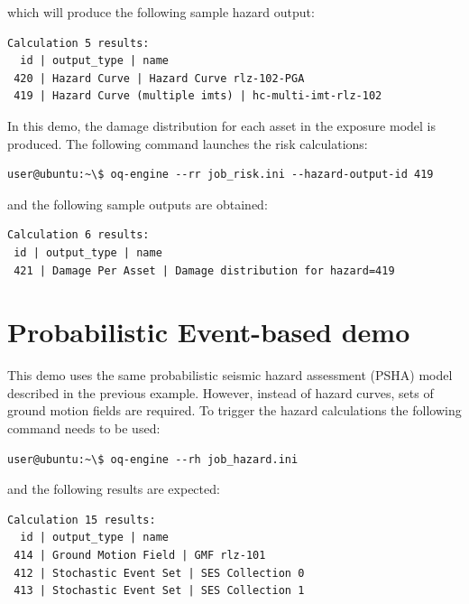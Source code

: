 which will produce the following sample hazard output:

\begin{Verbatim}[frame=single, commandchars=\\\{\}, samepage=true]
Calculation 5 results:
  id | output_type | name
 420 | Hazard Curve | Hazard Curve rlz-102-PGA
 419 | Hazard Curve (multiple imts) | hc-multi-imt-rlz-102
\end{Verbatim}

In this demo, the damage distribution for each asset in the exposure model is produced. The following command launches the risk calculations:

\begin{Verbatim}[frame=single, commandchars=\\\{\}, samepage=true]
user@ubuntu:~\$ oq-engine --rr job_risk.ini --hazard-output-id 419
\end{Verbatim}

and the following sample outputs are obtained:

\begin{Verbatim}[frame=single, commandchars=\\\{\}, samepage=true]
Calculation 6 results:
 id | output_type | name
 421 | Damage Per Asset | Damage distribution for hazard=419
\end{Verbatim}

\section{Probabilistic Event-based demo}
This demo uses the same probabilistic seismic hazard assessment (PSHA) model described in the previous example. However, instead of hazard curves, sets of ground motion fields are required. To trigger the hazard calculations the following command needs to be used:

\begin{Verbatim}[frame=single, commandchars=\\\{\}, samepage=true]
user@ubuntu:~\$ oq-engine --rh job_hazard.ini
\end{Verbatim}

and the following results are expected:

\begin{Verbatim}[frame=single, commandchars=\\\{\}, samepage=true]
Calculation 15 results:
  id | output_type | name
 414 | Ground Motion Field | GMF rlz-101
 412 | Stochastic Event Set | SES Collection 0
 413 | Stochastic Event Set | SES Collection 1
\end{Verbatim}

